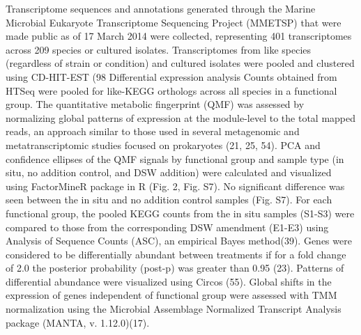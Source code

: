 Transcriptome sequences and annotations generated through the Marine Microbial Eukaryote Transcriptome Sequencing Project (MMETSP) that were made public as of 17 March 2014 were collected, representing 401 transcriptomes across 209 species or cultured isolates. Transcriptomes from like species (regardless of strain or condition) and cultured isolates were pooled and clustered using CD-HIT-EST (98%
Differential expression analysis
Counts obtained from HTSeq were pooled for like-KEGG orthologs across all species in a functional group. The quantitative metabolic fingerprint (QMF) was assessed by normalizing global patterns of expression at the module-level to the total mapped reads, an approach similar to those used in several metagenomic and metatranscriptomic studies focused on prokaryotes (21, 25, 54). PCA and confidence ellipses of the QMF signals by functional group and sample type (in situ, no addition control, and DSW addition) were calculated and visualized using FactorMineR package in R (Fig. 2, Fig. S7). No significant difference was seen between the in situ and no addition control samples (Fig. S7). For each functional group, the pooled KEGG counts from the in situ samples (S1-S3) were compared to those from the corresponding DSW amendment (E1-E3) using Analysis of Sequence Counts (ASC), an empirical Bayes method(39). Genes were considered to be differentially abundant between treatments if for a fold change of 2.0 the posterior probability (post-p) was greater than 0.95 (23). Patterns of differential abundance were visualized using Circos (55). Global shifts in the expression of genes independent of functional group were assessed with TMM normalization using the Microbial Assemblage Normalized Transcript Analysis package (MANTA, v. 1.12.0)(17). 
